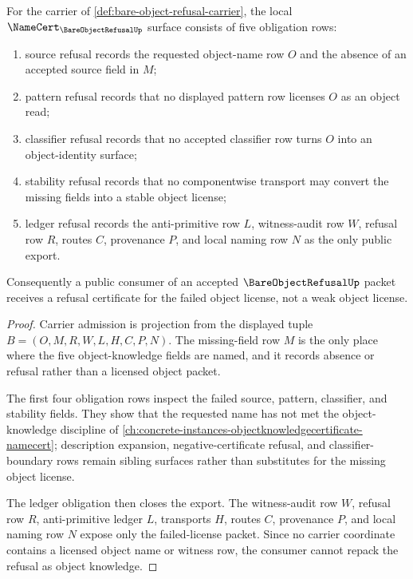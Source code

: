 \begin{theorem}
\label{thm:bare-object-refusal-namecert-obligations}
For the carrier of \autoref{def:bare-object-refusal-carrier}, the local $\NameCert_{\BareObjectRefusalUp}$ surface consists of five obligation rows:
\begin{enumerate}
\item source refusal records the requested object-name row $O$ and the absence of an accepted source field in $M$;
\item pattern refusal records that no displayed pattern row licenses $O$ as an object read;
\item classifier refusal records that no accepted classifier row turns $O$ into an object-identity surface;
\item stability refusal records that no componentwise transport may convert the missing fields into a stable object license;
\item ledger refusal records the anti-primitive row $L$, witness-audit row $W$, refusal row $R$, routes $C$, provenance $P$, and local naming row $N$ as the only public export.
\end{enumerate}
Consequently a public consumer of an accepted $\BareObjectRefusalUp$ packet receives a refusal certificate for the failed object license, not a weak object license.
\end{theorem}
\begin{proof}
Carrier admission is projection from the displayed tuple $B=(O,M,R,W,L,H,C,P,N)$. The missing-field row $M$ is the only place where the five object-knowledge fields are named, and it records absence or refusal rather than a licensed object packet.

The first four obligation rows inspect the failed source, pattern, classifier, and stability fields. They show that the requested name has not met the object-knowledge discipline of \autoref{ch:concrete-instances-objectknowledgecertificate-namecert}; description expansion, negative-certificate refusal, and classifier-boundary rows remain sibling surfaces rather than substitutes for the missing object license.

The ledger obligation then closes the export. The witness-audit row $W$, refusal row $R$, anti-primitive ledger $L$, transports $H$, routes $C$, provenance $P$, and local naming row $N$ expose only the failed-license packet. Since no carrier coordinate contains a licensed object name or witness row, the consumer cannot repack the refusal as object knowledge.
\end{proof}

